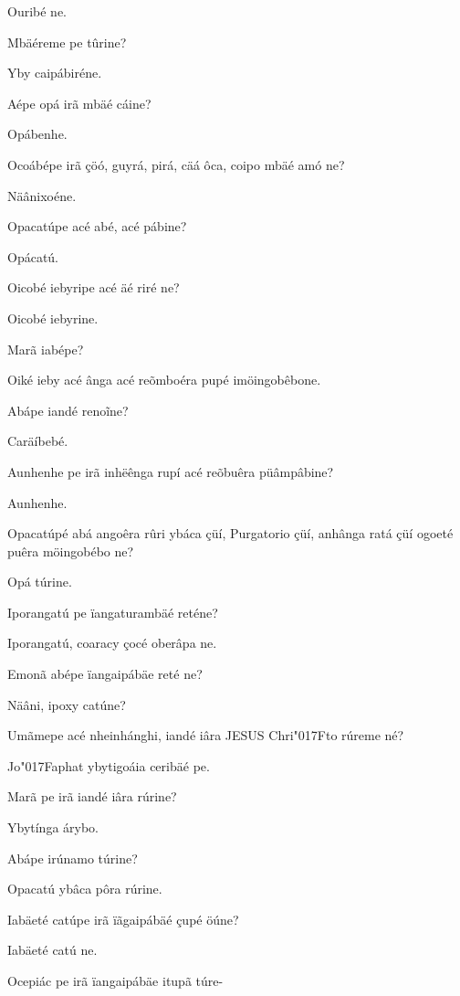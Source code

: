 \documentclass[openany,titlepage,12pt]{book}
\newcommand{\lgS}{\char"017F}
\begin{document}
\begin{altereven}
    \item Ouribé ne.
    \item Mbäéreme pe tûrine?
    \item Yby caipábiréne.
    \item Aépe opá irã mbäé cáine?
    \item Opábenhe.
    \item Ocoábépe irã çöó, guyrá, pirá, cäá ôca,
    coipo mbäé amó ne?
    \item Näânixoéne.
    \item Opacatúpe acé abé, acé pábine?
    \item Opácatú.
    \item Oicobé iebyripe acé äé riré ne?
    \item Oicobé iebyrine.
    \item Marã iabépe?
    \item Oiké ieby acé ânga acé reõmboéra pupé imöingobêbone.
    \item Abápe iandé reno\~ine?
    \item Caräíbebé.
    \item Aunhenhe pe irã inhëênga rupí acé reõbuêra püâmpâbine?
    \item Aunhenhe.
    \item Opacatúpé abá angoêra rûri ybáca çüí, Purgatorio çüí,
    anhânga ratá çüí ogoeté puêra möingobébo ne?
    \item Opá túrine.
    \item Iporangatú pe ïangaturambäé reténe?
    \item Iporangatú, coaracy çocé oberâpa ne.
    \item Emonã abépe ïangaipábäe reté ne?
    \item Näâni, ipoxy catúne?
    \item Umãmepe acé nheinhánghi, iandé iâra
    JESUS Chri\lgS to rúreme né?
    \item Jo\lgS aphat ybytigoáia ceribäé pe.
    \item Marã pe irã iandé iâra rúrine?
    \item Ybytínga árybo.
    \item Abápe irúnamo túrine?\newpage
    \item Opacatú ybâca pôra rúrine.
    \item Iabäeté catúpe irã ïãgaipábäé çupé öúne?
    \item Iabäeté catú ne.
    \item Ocepiác pe irã ïangaipábäe itupã túre-\linebreak

\end{altereven}
\end{document}
